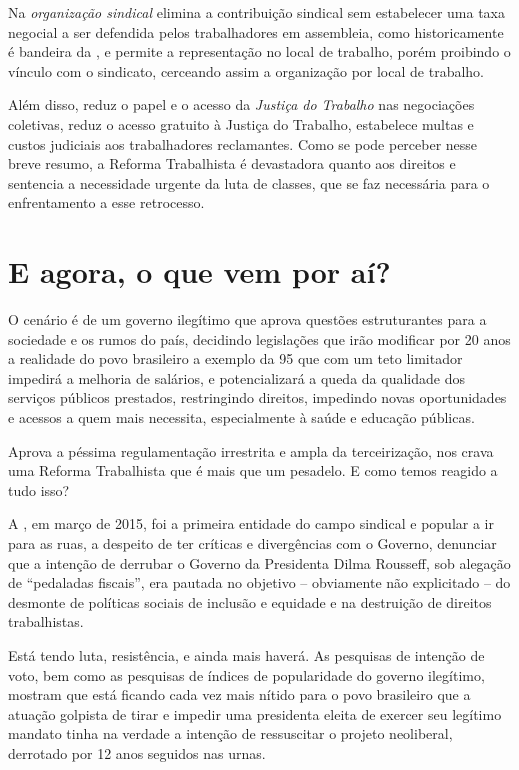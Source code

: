 Na \emph{organização sindical} elimina a contribuição sindical sem
estabelecer uma taxa negocial a ser defendida pelos trabalhadores em
assembleia, como historicamente é bandeira da , e permite a
representação no local de trabalho, porém proibindo o vínculo com o
sindicato, cerceando assim a organização por local de trabalho.

Além disso, reduz o papel e o acesso da \emph{Justiça do Trabalho} nas
negociações coletivas, reduz o acesso gratuito à Justiça do Trabalho,
estabelece multas e custos judiciais aos trabalhadores reclamantes. Como
se pode perceber nesse breve resumo, a Reforma Trabalhista é devastadora
quanto aos direitos e sentencia a necessidade urgente da luta de
classes, que se faz necessária para o enfrentamento a esse retrocesso.

\section{E agora, o que vem por aí?}

O cenário é de um governo ilegítimo que aprova questões estruturantes
para a sociedade e os rumos do país, decidindo legislações que irão
modificar por 20 anos a realidade do povo brasileiro a exemplo da  95
que com um teto limitador impedirá a melhoria de salários, e
potencializará a queda da qualidade dos serviços públicos prestados,
restringindo direitos, impedindo novas oportunidades e acessos a quem
mais necessita, especialmente à saúde e educação públicas.

Aprova a péssima regulamentação irrestrita e ampla da terceirização, nos
crava uma Reforma Trabalhista que é mais que um pesadelo. E como temos
reagido a tudo isso?

A , em março de 2015, foi a primeira entidade do campo sindical e
popular a ir para as ruas, a despeito de ter críticas e divergências com
o Governo, denunciar que a intenção de derrubar o Governo da Presidenta
Dilma Rousseff, sob alegação de ``pedaladas fiscais'', era pautada no
objetivo -- obviamente não explicitado -- do desmonte de políticas
sociais de inclusão e equidade e na destruição de direitos trabalhistas.

Está tendo luta, resistência, e ainda mais haverá. As pesquisas de
intenção de voto, bem como as pesquisas de índices de popularidade do
governo ilegítimo, mostram que está ficando cada vez mais nítido para o
povo brasileiro que a atuação golpista de tirar e impedir uma presidenta
eleita de exercer seu legítimo mandato tinha na verdade a intenção de
ressuscitar o projeto neoliberal, derrotado por 12 anos seguidos nas
urnas.

